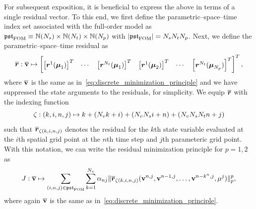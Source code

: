 \documentclass[3p,computermodern,10pt]{elsarticle}
\begin{document}
For subsequent exposition, it is beneficial to express the above in terms of a single residual vector. To this end, we first define the parametric--space--time index set associated with the full-order model as $\mathfrak{pst}_{\text{FOM}} \equiv \mathbb{N}(N_s) \times \mathbb{N}(N_t) \times \mathbb{N}(N_p)$ with $|\mathfrak{pst}_{\text{FOM}}| =  N_s N_t N_p$. Next, we define the parametric--space--time residual as
$$\overline{\boldsymbol{r}} : \overline{\mathbf{v}} \mapsto
\begin{bmatrix}
\left[\boldsymbol{r}^1(\boldsymbol \mu_1) \right]^T & \cdots & \left[ \boldsymbol{r}^{N_t}(\boldsymbol \mu_1) \right]^T & \left[  \boldsymbol{r}^{1}(\boldsymbol \mu_2) \right]^T & \cdots & \left[  \boldsymbol{r}^{N_t}(\boldsymbol \mu_{N_p}) \right]^T 
\end{bmatrix}^T,
$$ 
where $\overline{\mathbf{v}}$ is the same as in~\eqref{eq:discrete_minimization_principle} and we have suppressed the state arguments to the residuals, for simplicity. We equip $\overline{\boldsymbol{r}}$ with the indexing function
$$ \zeta: (k,i,n,j) \mapsto k + (N_v k  + i) + (N_v N_s i + n) + (N_v N_s N_t n + j)$$
 such that $\overline{\boldsymbol{r}}_{\zeta(k,i,n,j)}$ denotes the residual for the $k$th state variable evaluated at the $i$th spatial grid point at the $n$th time step and $j$th parameteric grid point. With this notation, we can write the residual minimization principle for $p=1,2$ as 
\begin{equation}\label{eq:discrete_minimization_principle_sums}
J : \overline{\mathbf{v}}  \mapsto \sum_{(i,n,j)\in \mathfrak{pst}_{\text{FOM}}}  \sum_{k=1}^{N_v} \alpha_{nj} \| \overline{\boldsymbol{r}}_{\zeta(k,i,n,j)} (\mathbf{v}^{n,j},\mathbf{v}^{n-1,j},\ldots,\mathbf{v}^{n-k^n,j},\mathbf{\mu}^j) \|_{p}^p,
\end{equation}
where again $\overline{\mathbf{v}}$ is the same as in~\eqref{eq:discrete_minimization_principle}. 
\end{document}
